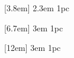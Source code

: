 

	[3.8em] %
	{\vspace{-4pt}} %
	{2.3em} %
	{1pc} %

	[6.7em] %
	{\vspace{-4pt}} %
	{3em} %
	{1pc} %

	[12em] %
	{\vspace{-6pt}} %
	{3em} %
	{1pc} %


